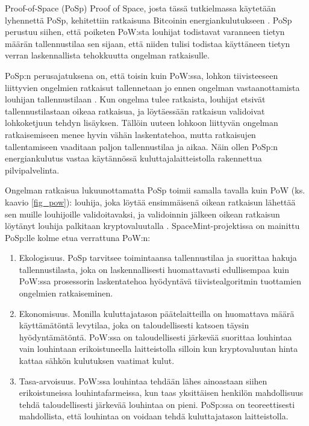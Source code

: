 \begin{section}{Proof-of-Space (PoSp)\label{posp}}
Proof of Space, josta tässä tutkielmassa käytetään lyhennettä PoSp, kehitettiin ratkaisuna Bitcoinin energiankulutukseen \cite{pospchia1,posp2}. PoSp perustuu siihen, että poiketen PoW:sta louhijat todistavat varanneen tietyn määrän tallennustilaa sen sijaan, että niiden tulisi todistaa käyttäneen tietyn verran laskennallista tehokkuutta ongelman ratkaisulle.

PoSp:n perusajatuksena on, että toisin kuin PoW:ssa, lohkon tiivisteeseen liittyvien ongelmien ratkaisut tallennetaan jo ennen ongelman vastaanottamista louhijan tallennustilaan \cite{posp3spacemint}. Kun ongelma tulee ratkaista, louhijat etsivät tallennustilastaan oikeaa ratkaisua, ja löytäessään ratkaisun validoivat lohkoketjuun tehdyn lisäyksen. Tällöin uuteen lohkoon liittyvän ongelman ratkaisemiseen menee hyvin vähän laskentatehoa, mutta ratkaisujen tallentamiseen vaaditaan paljon tallennustilaa ja aikaa. Näin ollen PoSp:n energiankulutus vastaa käytännössä kuluttajalaitteistolla rakennettua pilvipalvelinta.

Ongelman ratkaisua lukuunottamatta PoSp toimii samalla tavalla kuin PoW (ks. kaavio \ref{fig_pow}): louhija, joka löytää ensimmäisenä oikean ratkaisun lähettää sen muille louhijoille validoitavaksi, ja validoinnin jälkeen oikean ratkaisun löytänyt louhija palkitaan kryptovaluutalla \cite{posp3spacemint}. SpaceMint-projektissa on mainittu PoSp:lle kolme etua verrattuna PoW:n:

\begin{enumerate}
\item Ekologisuus. PoSp tarvitsee toimintaansa tallennustilaa ja suorittaa hakuja tallennustilasta, joka on laskennallisesti huomattavasti edullisempaa kuin PoW:ssa prosessorin laskentatehoa hyödyntävä tiivistealgoritmin tuottamien ongelmien ratkaiseminen.
\item Ekonomisuus. Monilla kuluttajatason päätelaitteilla on huomattava määrä käyttämätöntä levytilaa, joka on taloudellisesti katsoen täysin hyödyntämätöntä. PoW:ssa on taloudellisesti järkevää suorittaa louhintaa vain louhintaan erikoistuneella laitteistolla silloin kun kryptovaluutan hinta kattaa sähkön kulutuksen vaatimat kulut.
\item Tasa-arvoisuus. PoW:ssa louhintaa tehdään lähes ainoastaan siihen erikoistuneissa louhintafarmeissa, kun taas yksittäisen henkilön mahdollisuus tehdä taloudellisesti järkevää louhintaa on pieni. PoSp:ssa on teoreettisesti mahdollista, että louhintaa on voidaan tehdä kuluttajatason laitteistolla.
\end{enumerate}


\end{section}
